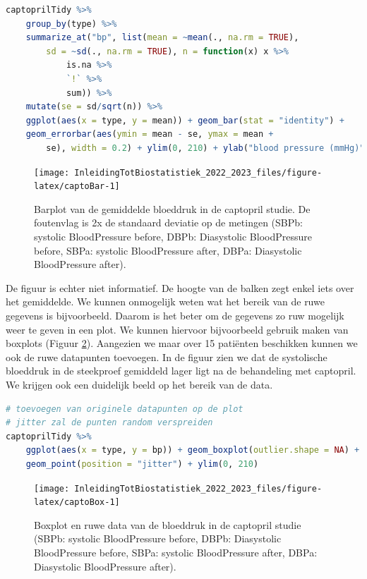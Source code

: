 \documentclass[
  12pt,dutch,coursenotes]{book}
\begin{document}
\begin{lstlisting}[language=R]
captoprilTidy %>%
    group_by(type) %>%
    summarize_at("bp", list(mean = ~mean(., na.rm = TRUE),
        sd = ~sd(., na.rm = TRUE), n = function(x) x %>%
            is.na %>%
            `!` %>%
            sum)) %>%
    mutate(se = sd/sqrt(n)) %>%
    ggplot(aes(x = type, y = mean)) + geom_bar(stat = "identity") +
    geom_errorbar(aes(ymin = mean - se, ymax = mean +
        se), width = 0.2) + ylim(0, 210) + ylab("blood pressure (mmHg)")
\end{lstlisting}

\begin{figure}

{\centering \texttt{[image: InleidingTotBiostatistiek\_2022\_2023\_files/figure-latex/captoBar-1]} 

}

\caption{Barplot van de gemiddelde bloeddruk in de captopril studie. De foutenvlag is 2x de standaard deviatie op de metingen (SBPb: systolic BloodPressure before, DBPb: Diasystolic BloodPressure before, SBPa: systolic BloodPressure after, DBPa: Diasystolic BloodPressure after).}\label{fig:captoBar}
\end{figure}

De figuur is echter niet informatief.
De hoogte van de balken zegt enkel iets over het gemiddelde.
We kunnen onmogelijk weten wat het bereik van de ruwe gegevens is bijvoorbeeld.
Daarom is het beter om de gegevens zo ruw mogelijk weer te geven in een plot.
We kunnen hiervoor bijvoorbeeld gebruik maken van boxplots (Figuur \ref{fig:captoBox}).
Aangezien we maar over 15 patiënten beschikken kunnen we ook de ruwe datapunten toevoegen.
In de figuur zien we dat de systolische bloeddruk in de steekproef gemiddeld lager ligt na de behandeling met captopril.
We krijgen ook een duidelijk beeld op het bereik van de data.

\begin{lstlisting}[language=R]
# toevoegen van originele datapunten op de plot
# jitter zal de punten random verspreiden
captoprilTidy %>%
    ggplot(aes(x = type, y = bp)) + geom_boxplot(outlier.shape = NA) +
    geom_point(position = "jitter") + ylim(0, 210)
\end{lstlisting}

\begin{figure}

{\centering \texttt{[image: InleidingTotBiostatistiek\_2022\_2023\_files/figure-latex/captoBox-1]} 

}

\caption{Boxplot en ruwe data van de bloeddruk in de captopril studie (SBPb: systolic BloodPressure before, DBPb: Diasystolic BloodPressure before, SBPa: systolic BloodPressure after, DBPa: Diasystolic BloodPressure after).}\label{fig:captoBox}
\end{figure}
\end{document}
